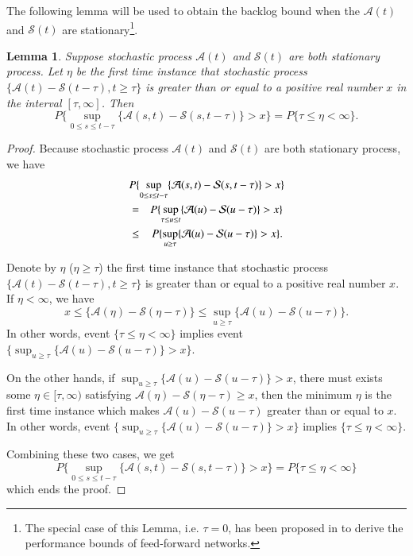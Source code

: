 \documentclass[paper]{ieice}
\newtheorem{lemma}{Lemma}
\newtheorem{proof}{Proof}
\begin{document}
The following lemma will be used to obtain the backlog bound when the $\mathcal{A}(t)$ and $\mathcal{S}(t)$ are stationary\footnote{The special case of this Lemma, i.e. $\tau=0$, has been proposed in \cite{5984844} to derive the performance bounds of feed-forward networks.}.
\begin{lemma}\label{lama3}
Suppose stochastic process $\mathcal{A}(t)$ and $\mathcal{S}(t)$ are both stationary process. Let $\eta$ be the first time instance that stochastic process $\{\mathcal{A}(t)-\mathcal{S}(t-\tau),t\geq \tau\}$ is greater than or equal to a positive real number $x$ in the interval $[\tau,\infty]$. Then
$$P\{\sup_{0\leq s\leq t-\tau}\{\mathcal{A}(s,t)-\mathcal{S}(s,t-\tau)\}>x\}=P\{\tau\leq \eta<\infty\}.$$
\end{lemma}
\begin{proof}
Because stochastic process $\mathcal{A}(t)$ and $\mathcal{S}(t)$ are both stationary process, we have
\begin{eqnarray*}
\lefteqn{P\{\sup_{0\leq s\leq t-\tau}\{\mathcal{A}(s,t)-\mathcal{S}(s,t-\tau)\}>x\}}\\
&=&P\{\sup_{\tau\leq u\leq t}\{\mathcal{A}(u)-\mathcal{S}(u-\tau)\}>x\}\\
&\leq&P\{\sup_{u\geq \tau}\{\mathcal{A}(u)-\mathcal{S}(u-\tau)\}>x\}.
\end{eqnarray*}

Denote by $\eta$ ($\eta\geq \tau$) the first time instance that stochastic process $\{\mathcal{A}(t)-\mathcal{S}(t-\tau),t\geq \tau\}$ is greater than or equal to a positive real number $x$. If $\eta<\infty$, we have
$$x\leq \{\mathcal{A}(\eta)-\mathcal{S}(\eta-\tau)\}\leq \sup_{u\geq \tau}\{\mathcal{A}(u)-\mathcal{S}(u-\tau)\}.$$
In other words, event $\{\tau\leq \eta<\infty\}$ implies event $\{\sup_{u\geq \tau}\{\mathcal{A}(u)-\mathcal{S}(u-\tau)\}>x\}$.

On the other hands, if $\sup_{u\geq \tau}\{\mathcal{A}(u)-\mathcal{S}(u-\tau)\}>x$, there must exists some $\eta\in[\tau,\infty)$ satisfying $\mathcal{A}(\eta)-\mathcal{S}(\eta-\tau)\geq x$, then the minimum $\eta$ is the first time instance which makes $\mathcal{A}(u)-\mathcal{S}(u-\tau)$ greater than or equal to $x$. In other words, event $\{\sup_{u\geq \tau}\{\mathcal{A}(u)-\mathcal{S}(u-\tau)\}>x\}$ implies $\{\tau\leq\eta<\infty\}$.

Combining these two cases, we get
$$P\{\sup_{0\leq s\leq t-\tau}\{\mathcal{A}(s,t)-\mathcal{S}(s,t-\tau)\}>x\}=P\{\tau\leq\eta<\infty\}$$
which ends the proof.\QED
\end{proof}
\end{document}
